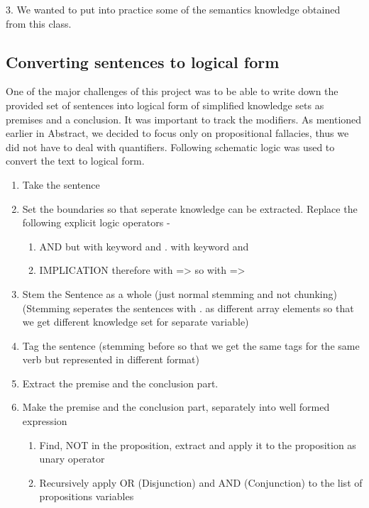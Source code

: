 \documentclass[english]{article}
\begin{document}
3. We wanted to put into practice some of the semantics knowledge
obtained from this class.


\subsection{Converting sentences to logical form}

One of the major challenges of this project was to be able to write
down the provided set of sentences into logical form of simplified
knowledge sets as premises and a conclusion. It was important to track
the modifiers. As mentioned earlier in Abstract, we decided to focus
only on propositional fallacies, thus we did not have to deal with
quantifiers. Following schematic logic was used to convert the text
to logical form.
\begin{enumerate}
\item Take the sentence 
\item Set the boundaries so that seperate knowledge can be extracted. Replace
the following explicit logic operators -

\begin{enumerate}
\item AND \textquotedbl{}but\textquotedbl{} with keyword \textquotedbl{}and\textquotedbl{}
\textquotedbl{}.\textquotedbl{} with keyword \textquotedbl{}and\textquotedbl{} 
\item IMPLICATION \textquotedbl{}therefore\textquotedbl{} with \textquotedbl{}=>\textquotedbl{}
\textquotedbl{}so\textquotedbl{} with \textquotedbl{}=>\textquotedbl{} 
\end{enumerate}
\item Stem the Sentence as a whole (just normal stemming and not chunking)
(Stemming seperates the sentences with \textquotedbl{}.\textquotedbl{}
as different array elements so that we get different knowledge set
for separate variable) 
\item Tag the sentence (stemming before so that we get the same tags for
the same verb but represented in different format) 
\item Extract the premise and the conclusion part. 
\item Make the premise and the conclusion part, separately into well formed
expression 

\begin{enumerate}
\item Find, NOT in the proposition, extract and apply it to the proposition
as unary operator 
\item Recursively apply OR (Disjunction) and AND (Conjunction) to the list
of propositions variables 
\end{enumerate}
\end{enumerate}
\end{document}
